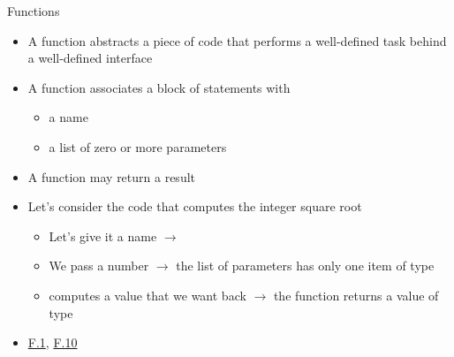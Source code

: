 \begin{frame}[fragile]{Functions}

  \begin{itemize}[<+->]
  \item A function abstracts a piece of code that performs a well-defined task
    behind a well-defined interface
  \item A function associates a block of statements with
    \begin{itemize}
    \item a name
    \item a list of zero or more parameters
    \end{itemize}
  \item A function may return a result
  \end{itemize}

  \begin{itemize}[<+->]
  \item Let's consider the code that computes the integer square root
    \begin{itemize}
    \item Let's give it a name $\rightarrow$ 
    \item We pass  a number $\rightarrow$ the list of parameters has
      only one item of type 
    \item {} computes a value that we want back $\rightarrow$ the
      function returns a value of type 
    \end{itemize}
  \end{itemize}

  \begin{itemize}[<+->]
  \item \href{https://isocpp.github.io/CppCoreGuidelines/CppCoreGuidelines#f1-package-meaningful-operations-as-carefully-named-functions}{F.1}, \href{https://isocpp.github.io/CppCoreGuidelines/CppCoreGuidelines#f10-if-an-operation-can-be-reused-give-it-a-name}{F.10}
  \end{itemize}
\end{frame}

